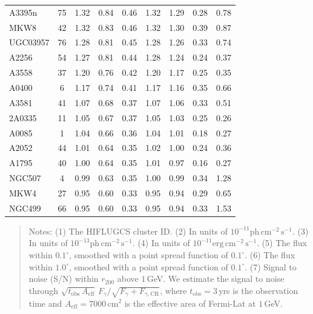 \documentclass[10pt,aps,pra,reprint,amsmath,amsfonts,amssymb,showpacs,nofootinbib,floatfix]{revtex4-1}
\newcommand{\rmn}{\mathrm}
\newcommand{\cm}{\rmn{cm}}
\newcommand{\vstt}{\vspace{-0.0mm}}
\newcommand{\CR}{\rmn{CR}}
\newcommand{\rvir}{r_{200}}
\begin{document}
\begin{table}
\begin{minipage}{2.0\columnwidth}
\begin{tabular}{l c c c c c c c c}
A3395n   &  75 &   1.32 &   0.84 &   0.46 &   1.32 &   1.29 &   0.28 &   0.78 \vstt \\
MKW8     &  42 &   1.32 &   0.83 &   0.46 &   1.32 &   1.30 &   0.39 &   0.87 \vstt \\
UGC03957 &  76 &   1.28 &   0.81 &   0.45 &   1.28 &   1.26 &   0.33 &   0.74 \vstt \\
A2256    &  54 &   1.27 &   0.81 &   0.44 &   1.28 &   1.24 &   0.24 &   0.37 \vstt \\
A3558    &  37 &   1.20 &   0.76 &   0.42 &   1.20 &   1.17 &   0.25 &   0.35 \vstt \\
A0400    &   6 &   1.17 &   0.74 &   0.41 &   1.17 &   1.16 &   0.35 &   0.66 \vstt \\
A3581    &  41 &   1.07 &   0.68 &   0.37 &   1.07 &   1.06 &   0.33 &   0.51 \vstt \\
2A0335   &  11 &   1.05 &   0.67 &   0.37 &   1.05 &   1.03 &   0.25 &   0.26 \vstt \\
A0085    &   1 &   1.04 &   0.66 &   0.36 &   1.04 &   1.01 &   0.18 &   0.27 \vstt \\
A2052    &  44 &   1.01 &   0.64 &   0.35 &   1.02 &   1.00 &   0.24 &   0.36 \vstt \\
A1795    &  40 &   1.00 &   0.64 &   0.35 &   1.01 &   0.97 &   0.16 &   0.27 \vstt \\
NGC507   &   4 &   0.99 &   0.63 &   0.35 &   1.00 &   0.99 &   0.34 &   1.28 \vstt \\
MKW4     &  27 &   0.95 &   0.60 &   0.33 &   0.95 &   0.94 &   0.29 &   0.65 \vstt \\
NGC499   &  66 &   0.95 &   0.60 &   0.33 &   0.95 &   0.94 &   0.33 &   1.53 \vstt \\
\hline
\hline
\end{tabular}
\begin{quote}
  Notes:
   (1) The HIFLUGCS cluster ID.
   (2) In units of $10^{-11} \rmn{ph}\,\rmn{cm}^{-2}\,\rmn{s}^{-1}$.
   (3) In units of $10^{-13} \rmn{ph}\,\rmn{cm}^{-2}\,\rmn{s}^{-1}$.
   (4) In units of $10^{-11} \rmn{erg}\,\rmn{cm}^{-2}\,\rmn{s}^{-1}$.
   (5) The flux within $0.1^\circ$, smoothed with a point spread function of $0.1^\circ$.
   (6) The flux within $1.0^\circ$, smoothed with a point spread function of $0.1^\circ$.
   (7) Signal to noise (S/N) within $\rvir$ above $1\,$GeV. We estimate the signal to
  noise through $\sqrt{t_\rmn{obs}\,A_\rmn{eff}}\,F_{\gamma}/\sqrt{F_{\gamma}+F_{\gamma,\CR}}$,
  where $t_\rmn{obs}=3\,$yrs is the observation time and $A_\rmn{eff} = 7000\,\cm^2$
    is the effective area of Fermi-Lat at $1\,$GeV.
  \label{tab:flux_tab_BM}
  \end{quote}
\end{minipage}
\end{table}
\end{document}
